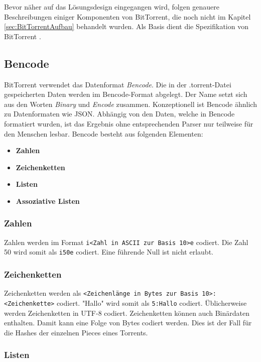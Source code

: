 Bevor näher auf das Lösungsdesign eingegangen wird, folgen genauere Beschreibungen einiger Komponenten von BitTorrent, die noch nicht im Kapitel \ref{sec:BitTorrentAufbau} behandelt wurden. Als Basis dient die Spezifikation von BitTorrent \parencite{BitTorrentSpecification}. 

\subsection{Bencode}

BitTorrent verwendet das Datenformat \emph{Bencode}. Die in der .torrent-Datei gespeicherten Daten werden im Bencode-Format abgelegt. Der Name setzt sich aus den Worten \emph{Binary} und \emph{Encode} zusammen. Konzeptionell ist Bencode ähnlich zu Datenformaten wie JSON. Abhängig von den Daten, welche in Bencode formatiert wurden, ist das Ergebnis ohne entsprechenden Parser nur teilweise für den Menschen lesbar. Bencode besteht aus folgenden Elementen:

\begin{itemize}
    \item \textbf{Zahlen}
    \item \textbf{Zeichenketten}
    \item \textbf{Listen}
    \item \textbf{Assoziative Listen}
\end{itemize}

\subsubsection{Zahlen}
Zahlen werden im Format \verb|i<Zahl in ASCII zur Basis 10>e| codiert. Die Zahl 50 wird somit als \verb|i50e| codiert. Eine führende Null ist nicht erlaubt.

\subsubsection{Zeichenketten}
Zeichenketten werden als \verb|<Zeichenlänge in Bytes zur Basis 10>:<Zeichenkette>| codiert. "Hallo" wird somit als \verb|5:Hallo|  codiert. Üblicherweise werden Zeichenketten in UTF-8 codiert. Zeichenketten können auch Binärdaten enthalten. Damit kann eine Folge von Bytes codiert werden. Dies ist der Fall für die Hashes der einzelnen Pieces eines Torrents. 

\subsubsection{Listen}

